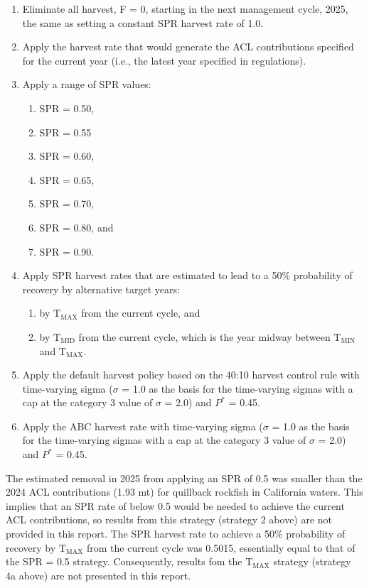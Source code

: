 \documentclass[11pt,
  letterpaper,
]{article}
\begin{document}
\begin{enumerate}
    \item Eliminate all harvest, F = 0, starting in the next management cycle, 2025, the same as setting a constant SPR harvest rate of 1.0.
    \item Apply the harvest rate that would generate the ACL contributions specified for the current year (i.e., the latest year specified in regulations). 
    \item Apply a range of SPR values: 
    \begin{enumerate}
     \item SPR = 0.50,
     \item SPR = 0.55
     \item SPR = 0.60,
     \item SPR = 0.65,
     \item SPR = 0.70,
     \item SPR = 0.80, and
     \item SPR = 0.90. 
    \end{enumerate}
    \item Apply SPR harvest rates that are estimated to lead to a 50$\%$ probability of recovery by alternative target years: 
    \begin{enumerate}
     \item by $\text{T}_\text{MAX}$ from the current cycle, and 
     \item by $\text{T}_\text{MID}$ from the current cycle, which is the year midway between $\text{T}_\text{MIN}$ and $\text{T}_\text{MAX}$.
    \end{enumerate}
    \item Apply the default harvest policy based on the 40:10 harvest control rule with time-varying sigma ($\sigma$ = 1.0 as the basis for the time-varying sigmas with a cap at the category 3 value of $\sigma$ = 2.0) and $P^*$ = 0.45.
    \item Apply the ABC harvest rate with time-varying sigma ($\sigma$ = 1.0 as the basis for the time-varying sigmas with a cap at the category 3 value of $\sigma$ = 2.0) and $P^*$ = 0.45.
\end{enumerate}

The estimated removal in 2025 from applying an SPR of 0.5 was smaller than the 2024 ACL contributions (1.93 mt) for quillback rockfish in California waters. This implies that an SPR rate of below 0.5 would be needed to achieve the current ACL contributions, so results from this strategy (strategy 2 above) are not provided in this report. The SPR harvest rate to achieve a 50\(\%\) probability of recovery by \(\text{T}_\text{MAX}\) from the current cycle was 0.5015, essentially equal to that of the SPR = 0.5 strategy. Consequently, results fom the \(\text{T}_\text{MAX}\) strategy (strategy 4a above) are not presented in this report.
\end{document}
